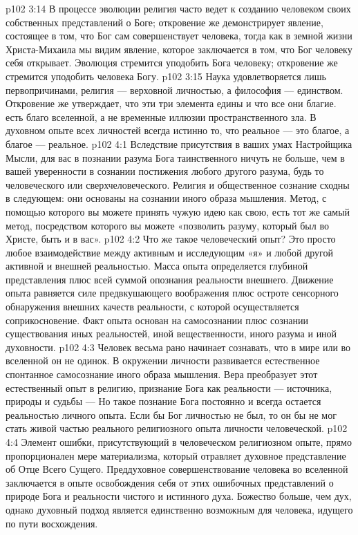 \vs p102 3:14 В процессе эволюции религия часто ведет к созданию человеком своих собственных представлений о Боге; откровение же демонстрирует явление, состоящее в том, что Бог сам совершенствует человека, тогда как в земной жизни Христа\hyp{}Михаила мы видим явление, которое заключается в том, что Бог человеку себя открывает. Эволюция стремится уподобить Бога человеку; откровение же стремится уподобить человека Богу.
\vs p102 3:15 Наука удовлетворяется лишь первопричинами, религия --- верховной личностью, а философия --- единством. Откровение же утверждает, что эти три элемента едины и что все они благие.  есть благо вселенной, а не временные иллюзии пространственного зла. В духовном опыте всех личностей всегда истинно то, что реальное --- это благое, а благое --- реальное.
\vs p102 4:1 Вследствие присутствия в ваших умах Настройщика Мысли, для вас в познании разума Бога таинственного ничуть не больше, чем в вашей уверенности в сознании постижения любого другого разума, будь то человеческого или сверхчеловеческого. Религия и общественное сознание сходны в следующем: они основаны на сознании иного образа мышления. Метод, с помощью которого вы можете принять чужую идею как свою, есть тот же самый метод, посредством которого вы можете «позволить разуму, который был во Христе, быть и в вас».
\vs p102 4:2 Что же такое человеческий опыт? Это просто любое взаимодействие между активным и исследующим «я» и любой другой активной и внешней реальностью. Масса опыта определяется глубиной представления плюс всей суммой опознания реальности внешнего. Движение опыта равняется силе предвкушающего воображения плюс остроте сенсорного обнаружения внешних качеств реальности, с которой осуществляется соприкосновение. Факт опыта основан на самосознании плюс сознании существования иных реальностей, иной вещественности, иного разума и иной духовности.
\vs p102 4:3 Человек весьма рано начинает сознавать, что в мире или во вселенной он не одинок. В окружении личности развивается естественное спонтанное самосознание иного образа мышления. Вера преобразует этот естественный опыт в религию, признание Бога как реальности --- источника, природы и судьбы ---  Но такое познание Бога постоянно и всегда остается реальностью личного опыта. Если бы Бог личностью не был, то он бы не мог стать живой частью реального религиозного опыта личности человеческой.
\vs p102 4:4 Элемент ошибки, присутствующий в человеческом религиозном опыте, прямо пропорционален мере материализма, который отравляет духовное представление об Отце Всего Сущего. Преддуховное совершенствование человека во вселенной заключается в опыте освобождения себя от этих ошибочных представлений о природе Бога и реальности чистого и истинного духа. Божество больше, чем дух, однако духовный подход является единственно возможным для человека, идущего по пути восхождения.
